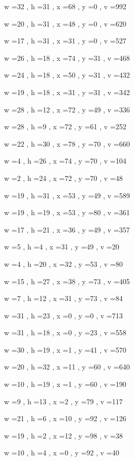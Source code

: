 \documentclass[11pt]{article}
\begin{document}
w =32 , h =31 , x =68 , y =0 , v =992
\par
w =20 , h =31 , x =48 , y =0 , v =620
\par
w =17 , h =31 , x =31 , y =0 , v =527
\par
w =26 , h =18 , x =74 , y =31 , v =468
\par
w =24 , h =18 , x =50 , y =31 , v =432
\par
w =19 , h =18 , x =31 , y =31 , v =342
\par
w =28 , h =12 , x =72 , y =49 , v =336
\par
w =28 , h =9 , x =72 , y =61 , v =252
\par
w =22 , h =30 , x =78 , y =70 , v =660
\par
w =4 , h =26 , x =74 , y =70 , v =104
\par
w =2 , h =24 , x =72 , y =70 , v =48
\par
w =19 , h =31 , x =53 , y =49 , v =589
\par
w =19 , h =19 , x =53 , y =80 , v =361
\par
w =17 , h =21 , x =36 , y =49 , v =357
\par
w =5 , h =4 , x =31 , y =49 , v =20
\par
w =4 , h =20 , x =32 , y =53 , v =80
\par
w =15 , h =27 , x =38 , y =73 , v =405
\par
w =7 , h =12 , x =31 , y =73 , v =84
\par
w =31 , h =23 , x =0 , y =0 , v =713
\par
w =31 , h =18 , x =0 , y =23 , v =558
\par
w =30 , h =19 , x =1 , y =41 , v =570
\par
w =20 , h =32 , x =11 , y =60 , v =640
\par
w =10 , h =19 , x =1 , y =60 , v =190
\par
w =9 , h =13 , x =2 , y =79 , v =117
\par
w =21 , h =6 , x =10 , y =92 , v =126
\par
w =19 , h =2 , x =12 , y =98 , v =38
\par
w =10 , h =4 , x =0 , y =92 , v =40
\par
\newpage
\end{document}
